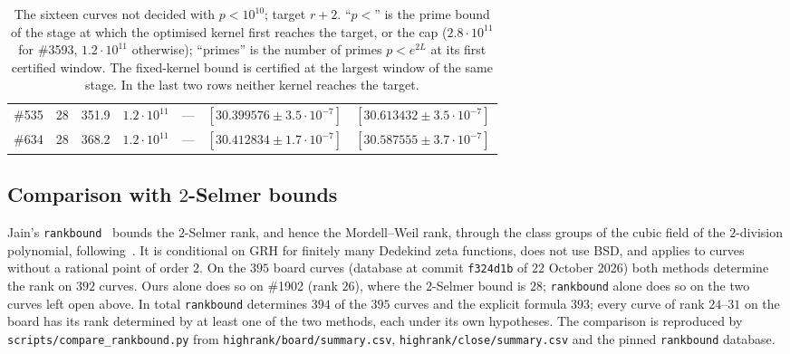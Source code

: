 \documentclass[11pt]{amsart}
\theoremstyle{remark}
\theoremstyle{definition}
\begin{document}
\begin{table}[!ht]
\begin{tabular}{rrrrrll}
\#535 & 28 & 351.9 & $1.2\cdot10^{11}$ & --- & $[30.399576\pm3.5\cdot10^{-7}]$ & $[30.613432\pm3.5\cdot10^{-7}]$\\
\#634 & 28 & 368.2 & $1.2\cdot10^{11}$ & --- & $[30.412834\pm1.7\cdot10^{-7}]$ & $[30.587555\pm3.7\cdot10^{-7}]$\\
\bottomrule
\end{tabular}
\caption{The sixteen curves not decided with $p<10^{10}$; target $r+2$. ``$p<$'' is the prime bound of the stage at which the optimised kernel first reaches the target, or the cap ($2.8\cdot10^{11}$ for \#3593, $1.2\cdot10^{11}$ otherwise); ``primes'' is the number of primes $p<e^{2L}$ at its first certified window. The fixed-kernel bound is certified at the largest window of the same stage. In the last two rows neither kernel reaches the target.}
\label{tab:close}
\end{table}

\subsection*{\texorpdfstring{Comparison with $2$-Selmer bounds}{Comparison with 2-Selmer bounds}}
Jain's \texttt{rankbound}~\cite{Jain} bounds the $2$-Selmer rank, and hence the Mordell--Weil rank, through the class groups of the cubic field of the $2$-division polynomial, following~\cite{BDF,KSW}. It is conditional on GRH for finitely many Dedekind zeta functions, does not use BSD, and applies to curves without a rational point of order $2$. On the $395$ board curves (database at commit \texttt{f324d1b} of 22 October 2026) both methods determine the rank on $392$ curves. Ours alone does so on \#1902 (rank $26$), where the $2$-Selmer bound is $28$; \texttt{rankbound} alone does so on the two curves left open above. In total \texttt{rankbound} determines $394$ of the $395$ curves and the explicit formula $393$; every curve of rank $24$--$31$ on the board has its rank determined by at least one of the two methods, each under its own hypotheses. The comparison is reproduced by \texttt{scripts/compare\_rankbound.py} from \texttt{highrank/board/summary.csv}, \texttt{highrank/close/summary.csv} and the pinned \texttt{rankbound} database.
\end{document}
